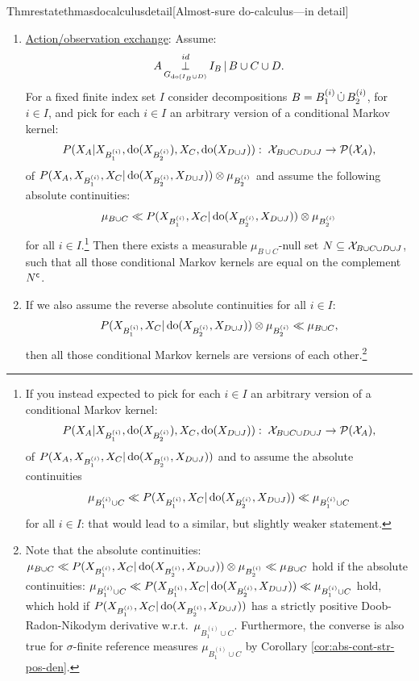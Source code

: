 \begin{restatable}{Thm}{restatethmasdocalculusdetail}[Almost-sure do-calculus---in detail]
\begin{enumerate}
\item \underline{Action/observation exchange}: Assume:
            \[ A \operatorname*{\perp}^{id}_{G_{\operatorname{do}(I_B \cup D)}} I_B \operatorname*{|} B \cup C \cup D.   \]
            For a fixed finite index set $I$ consider decompositions
            $B=B_1^{(i)} \,\dot{\cup}\, B_2^{(i)}$, for $i \in I$,
            and pick for each $i \in I$ an arbitrary version of a conditional Markov kernel:
            \[ P(X_A|X_{B_1^{(i)}},\operatorname{do}(X_{B_2^{(i)}}),X_C,\operatorname{do}(X_{D\cup J})): 
            \;\mathcal{X}_{B \cup C \cup D \cup J} \to \mathcal{P}(\mathcal{X}_A), \]
            of $P(X_A,X_{B_1^{(i)}},X_C|\operatorname{do}(X_{B_2^{(i)}},X_{D\cup J})) \otimes \mu_{B_2^{(i)}}$ 
            and assume the following absolute continuities:
            \[ \mu_{B \cup C} \ll  P(X_{B_1^{(i)}},X_C|\operatorname{do}(X_{B_2^{(i)}},X_{D\cup J})) \otimes \mu_{B_2^{(i)}} \]
            for all $i \in I$.\footnote{If you instead expected to pick for each $i \in I$ an arbitrary version of a conditional Markov kernel:
            \[ P(X_A|X_{B_1^{(i)}},\operatorname{do}(X_{B_2^{(i)}}),X_C,\operatorname{do}(X_{D\cup J})): \;\mathcal{X}_{B \cup C \cup D \cup J} \to \mathcal{P}(\mathcal{X}_A), \]
            of $P(X_A,X_{B_1^{(i)}},X_C|\operatorname{do}(X_{B_2^{(i)}},X_{D\cup J}))$ and to assume the absolute continuities
            \[ \mu_{B_1^{(i)} \cup C} \ll  P(X_{B_1^{(i)}},X_C|\operatorname{do}(X_{B_2^{(i)}},X_{D\cup J})) \ll \mu_{B_1^{(i)} \cup C} \]
            for all $i \in I$: that would lead to a similar, but slightly weaker statement.}
        Then there exists a measurable $\mu_{B \cup C}$-null set
        $N \subseteq \mathcal{X}_{B \cup C \cup D \cup J}$,
        such that all those conditional Markov kernels are equal on the complement $N^{\mathsf{c}}$.
      \item[] If we also assume the reverse absolute continuities for all $i \in I$:
         \[  P(X_{B_1^{(i)}},X_C|\operatorname{do}(X_{B_2^{(i)}},X_{D\cup J})) \otimes \mu_{B_2^{(i)}} \ll \mu_{B \cup C}, \]
         then all those conditional Markov kernels are versions of each other.\footnote{Note that the absolute continuities: $ \mu_{B \cup C} \ll P(X_{B_1^{(i)}},X_C|\operatorname{do}(X_{B_2^{(i)}},X_{D\cup J})) \otimes \mu_{B_2^{(i)}} \ll \mu_{B \cup C} $ hold if the absolute continuities: $\mu_{B_1^{(i)} \cup C} \ll P(X_{B_1^{(i)}},X_C|\operatorname{do}(X_{B_2^{(i)}},X_{D\cup J})) \ll \mu_{B_1^{(i)} \cup C} $ hold, which hold if $P(X_{B_1^{(i)}},X_C|\operatorname{do}(X_{B_2^{(i)}},X_{D\cup J}))$ has a strictly positive Doob-Radon-Nikodym derivative w.r.t.\ $\mu_{B_1^{(i)} \cup C}$. Furthermore, the converse is also true for $\sigma$-finite reference measures $\mu_{B_1^{(i)} \cup C}$ by Corollary \ref{cor:abs-cont-str-pos-den}.}


\end{enumerate}
\end{restatable}
